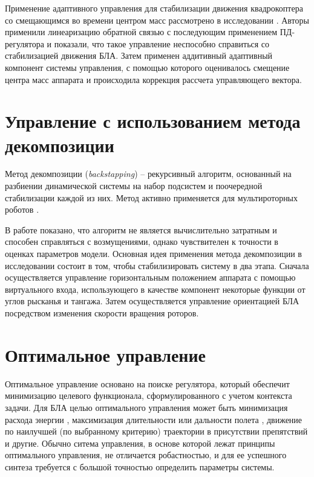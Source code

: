 Применение адаптивного управления для стабилизации движения квадрокоптера со смещающимся во времени центром масс рассмотрено в исследовании \cite{Palunko01}. Авторы применили линеаризацию обратной связью с последующим применением ПД-регулятора и показали, что такое управление неспособно справиться со стабилизацией движения БЛА. Затем применен аддитивный адаптивный компонент системы управления, с помощью которого оценивалось смещение центра масс аппарата и происходила коррекция рассчета управляющего вектора.

\section{Управление с использованием метода декомпозиции}

Метод декомпозиции (\textit{backstapping}) -- рекурсивный алгоритм, основанный на разбиении динамической системы на набор подсистем и поочередной стабилизации каждой из них. Метод активно применяется для мультироторных роботов \cite{Pota01, Chen01, Jung01, Huo01}.

В работе \cite{Madani01} показано, что алгоритм не является вычислительно затратным и способен справляться с возмущениями, однако чувствителен к точности в оценках параметров модели. Основная идея применения метода декомпозиции в исследовании состоит в том, чтобы стабилизировать систему в два этапа. Сначала осуществляется управление горизонтальным положением аппарата с помощью виртуального входа, использующего в качестве компонент некоторые функции от углов рысканья и тангажа. Затем осуществляется управление ориентацией БЛА  посредством изменения скорости вращения роторов.

\section{Оптимальное управление}

Оптимальное управление основано на поиске регулятора, который обеспечит минимизацию целевого функционала, сформулированного с учетом контекста задачи.
Для БЛА целью оптимального управления может быть минимизация расхода энергии \cite{Morbidi01, Huang01}, максимизация длительности или дальности полета \cite{Cowling01, Suicmez01}, движение по наилучшей (по выбранному критерию) траектории в присутствии препятствий \cite{Chen02, Cheng01} и другие.
Обычно ситема управления, в основе которой лежат принципы оптимального управления, не отличается робастностью, и для ее успешного синтеза требуется с большой точностью определить параметры системы.

